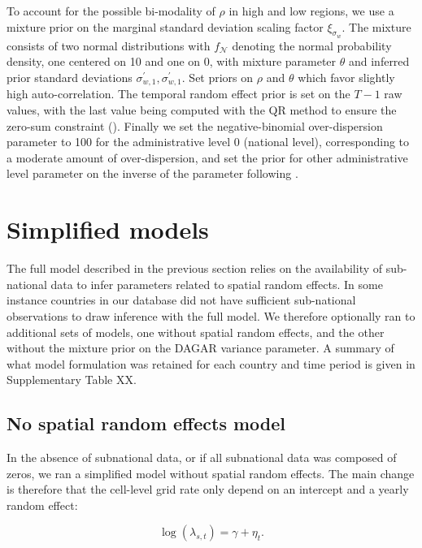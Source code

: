 \documentclass[
]{article}
\begin{document}
To account for the possible bi-modality of \(\rho\) in high and low regions, we use a mixture prior on the marginal standard deviation scaling factor \(\xi_{\sigma_w}\). The mixture consists of two normal distributions with \(f_{\mathcal{N}}\) denoting the normal probability density, one centered on 10 and one on 0, with mixture parameter \(\theta\) and inferred prior standard deviations \(\sigma^\prime_{w,1}, \sigma^\prime_{w,1}\). Set priors on \(\rho\) and \(\theta\) which favor slightly high auto-correlation. The temporal random effect prior is set on the \(T-1\) raw values, with the last value being computed with the QR method to ensure the zero-sum constraint (\textcite{sumtozero}). Finally we set the negative-binomial over-dispersion parameter to 100 for the administrative level 0 (national level), corresponding to a moderate amount of over-dispersion, and set the prior for other administrative level parameter on the inverse of the parameter following \textcite{Gelman2020}.

\hypertarget{simplified-models}{%
\section{Simplified models}\label{simplified-models}}

The full model described in the previous section relies on the availability of sub-national data to infer parameters related to spatial random effects. In some instance countries in our database did not have sufficient sub-national observations to draw inference with the full model. We therefore optionally ran to additional sets of models, one without spatial random effects, and the other without the mixture prior on the DAGAR variance parameter. A summary of what model formulation was retained for each country and time period is given in Supplementary Table XX.

\hypertarget{no-spatial-random-effects-model}{%
\subsection{No spatial random effects model}\label{no-spatial-random-effects-model}}

In the absence of subnational data, or if all subnational data was composed of zeros, we ran a simplified model without spatial random effects. The main change is therefore that the cell-level grid rate only depend on an intercept and a yearly random effect:

\[
\log(\lambda_{s,t}) = \gamma + \eta_t.
\]
\end{document}
